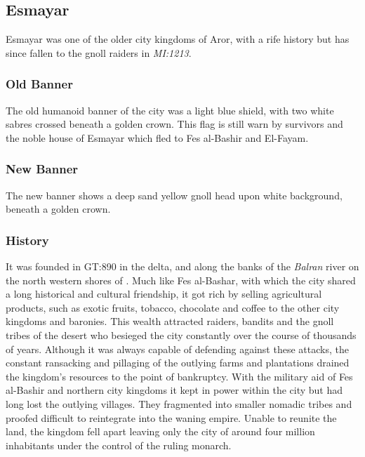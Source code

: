 \subsection{Esmayar}
\label{sec:Esmayar}

Esmayar was one of the older city kingdoms of Aror, with a rife history but has
since fallen to the gnoll raiders in \emph{MI:1213}.

\subsubsection{Old Banner}

The old humanoid banner of the city was a light blue shield, with two white
sabres crossed beneath a golden crown. This flag is still warn by survivors and
the noble house of Esmayar which fled to Fes al-Bashir and El-Fayam.

\subsubsection{New Banner}

The new banner shows a deep sand yellow gnoll head upon white background,
beneath a golden crown.

\subsubsection{History}

It was founded in GT:890 in the delta, and along the banks of the \emph{Balran}
river on the north western shores of . Much like Fes
al-Bashar, with which the city shared a long historical and cultural
friendship, it got rich by selling agricultural products, such as exotic
fruits, tobacco, chocolate and coffee to the other city kingdoms and
baronies. This wealth attracted raiders, bandits and the gnoll tribes of the
desert who besieged the city constantly over the course of thousands of
years. Although it was always capable of defending against these attacks, the
constant ransacking and pillaging of the outlying farms and plantations
drained the kingdom's resources to the point of bankruptcy. With the military
aid of Fes al-Bashir and northern city kingdoms it kept in power within the
city but had long lost the outlying villages. They fragmented into smaller
nomadic tribes and proofed difficult to reintegrate into the waning
empire. Unable to reunite the land, the kingdom fell apart leaving only the
city of around four million inhabitants under the control of the ruling
monarch.

